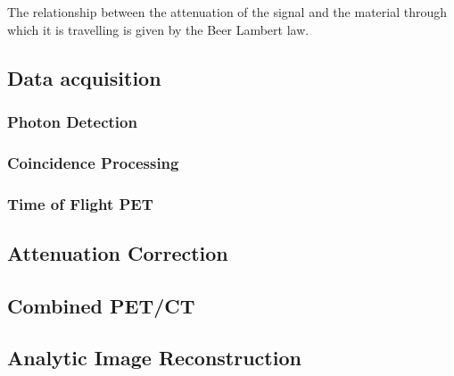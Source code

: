                 The relationship between the attenuation of the signal and the material through which it is travelling is given by the Beer Lambert law.
        
        \subsection{Data acquisition} \label{data_acquisition}
            \blindtext
            
            \subsubsection{Photon Detection} \label{photon_detection}
                \blindtext
            
            \subsubsection{Coincidence Processing} \label{coincidence_processing}
                \blindtext
            
            \subsubsection{Time of Flight PET} \label{tof_pet}
                \blindtext
            
        \subsection{Attenuation Correction} \label{attenuation_correction}
            \blindtext
            
            \subsection{Combined PET/CT} \label{combined_pet_ct}
                \blindtext
    
        \blindtext
        
        \subsection{Analytic Image Reconstruction} \label{analytic_image_reconstruction}
            \blindtext
        
